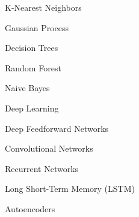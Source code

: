 \documentclass[11pt]{article}
\begin{document}
\begin{enumerate}
\begin{item}
\begin{enumerate}
\begin{item}
\begin{enumerate}
                \begin{item}
                  K-Nearest Neighbors
                \end{item}

                \begin{item}
                  Gaussian Process
                \end{item}

                \begin{item}
                  Decision Trees
                \end{item}

                \begin{item}
                  Random Forest
                \end{item}

                \begin{item}
                  Naive Bayes
                \end{item}

                \begin{item}

                  Deep Learning

                  \begin{enumerate}

                      \begin{item}
                        Deep Feedforward Networks
                      \end{item}

                      \begin{item}
                        Convolutional Networks
                      \end{item}

                      \begin{item}
                        Recurrent Networks
                      \end{item}

                      \begin{item}
                        Long Short-Term Memory (LSTM)
                      \end{item}

                      \begin{item}
                        Autoencoders
                      \end{item}

                  \end{enumerate}


\end{item}
\end{enumerate}
\end{item}
\end{enumerate}
\end{item}
\end{enumerate}
\end{document}
